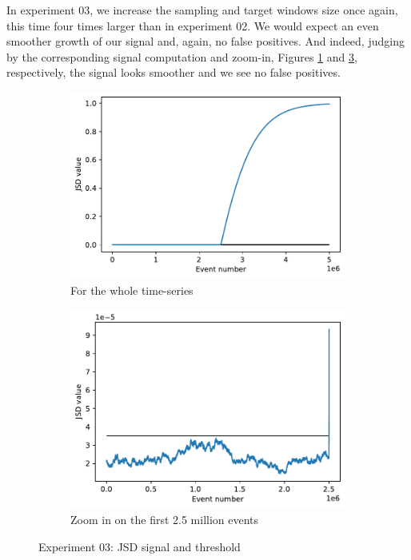 In experiment 03, we increase the sampling and target windows size once again, this time four times larger than in experiment 02. We would expect an even smoother growth of our signal and, again, no false positives. And indeed, judging by the corresponding signal computation and zoom-in, Figures \ref{fig:JSD-signal-03} and \ref{fig:JSD-signal-zoom-03}, respectively, the signal looks smoother and we see no false positives.
\begin{figure}[!htb]
\centering
\begin{subfigure}{.5\textwidth}
  \centering
  \includegraphics[width=1\linewidth]{figures/stream-analysis-viz-250000.pdf}
  \caption{For the whole time-series}
  \label{fig:JSD-signal-03}
\end{subfigure}%
\begin{subfigure}{.5\textwidth}
  \centering
  \includegraphics[width=1\linewidth]{figures/stream-analysis-viz-zoom-250000.pdf}
  \caption{Zoom in on the first 2.5 million events}
  \label{fig:JSD-signal-zoom-03}
\end{subfigure}
\caption{Experiment 03: JSD signal and threshold}
\end{figure}


